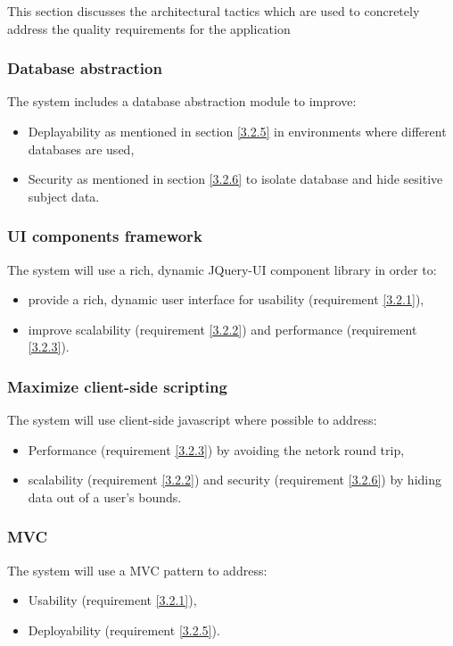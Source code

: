 This section discusses the architectural tactics which are used to concretely address the quality
requirements for the application

\subsubsection{Database abstraction}
The system includes a database abstraction module to improve:
\begin {itemize}
\item Deplayability as mentioned in section \ref {3.2.5} in environments where different databases are used,
\item Security as mentioned in section \ref {3.2.6} to isolate database and hide sesitive subject data.
\end {itemize}

\subsubsection{UI components framework}
The system will use a rich, dynamic JQuery-UI component library in order to:
\begin {itemize}
\item provide a rich, dynamic user interface for usability (requirement \ref {3.2.1}),
\item improve scalability (requirement \ref {3.2.2}) and performance (requirement \ref {3.2.3}).
\end{itemize}

\subsubsection{Maximize client-side scripting}
The system will use client-side javascript where possible to address:
\begin {itemize}
\item Performance (requirement \ref {3.2.3}) by avoiding the netork round trip,
\item scalability (requirement \ref {3.2.2}) and security (requirement \ref {3.2.6}) by hiding data out of a user's bounds.
\end{itemize}

\subsubsection{MVC}
The system will use a MVC pattern to address:
\begin {itemize}
\item Usability (requirement \ref {3.2.1}),
\item Deployability (requirement \ref {3.2.5}).
\end{itemize}
